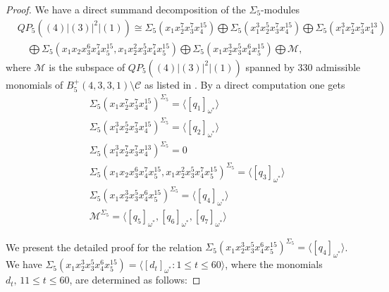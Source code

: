 \documentclass[reqno]{amsart}
\theoremstyle{plain}
\theoremstyle{definition}
\theoremstyle{plain}
\theoremstyle{definition}
\numberwithin{equation}{section}
\begin{document}
\begin{proof} We have a direct summand decomposition of the $\Sigma_5$-modules
\begin{align*}
&QP_5((4)|(3)|^2|(1)) \cong \Sigma_5(x_1x_2^7x_3^7x_4^{15})\bigoplus \Sigma_5(x_1^3x_2^5x_3^7x_4^{15}) \bigoplus \Sigma_5(x_1^3x_2^7x_3^7x_4^{13})\\
&\quad \bigoplus \Sigma_5(x_1x_2x_3^6x_4^7x_5^{15}, x_1x_2^2x_3^5x_4^7x_5^{15}) \bigoplus \Sigma_5(x_1x_2^3x_3^5x_4^6x_5^{15})\bigoplus \mathcal M,
\end{align*}
where $\mathcal M$ is the subspace of $QP_5((4)|(3)|^2|(1))$ spanned by 330 admissible monomials of $B_5^+(4,3,3,1)\setminus \mathcal C$ as listed in \cite[Theorem 3.3.7]{smo}. By a direct computation one gets
\begin{align*}
&\Sigma_5(x_1x_2^7x_3^7x_4^{15})^{\Sigma_5} = \langle[q_1]_{\omega^*}\rangle\\
&\Sigma_5(x_1^3x_2^5x_3^7x_4^{15})^{\Sigma_5} = \langle[q_2]_{\omega^*}\rangle\\
&\Sigma_5(x_1^3x_2^7x_3^7x_4^{13})^{\Sigma_5} = 0\\
&\Sigma_5(x_1x_2x_3^6x_4^7x_5^{15}, x_1x_2^2x_3^5x_4^7x_5^{15})^{\Sigma_5} = \langle[q_3]_{\omega^*}\rangle\\
&\Sigma_5(x_1x_2^3x_3^5x_4^6x_5^{15})^{\Sigma_5} = \langle[q_4]_{\omega^*}\rangle\\
&\mathcal M^{\Sigma_5} = \langle [q_5]_{\omega^*}, [q_6]_{\omega^*}, [q_7]_{\omega^*}\rangle
\end{align*}

\medskip
We present the detailed proof for the relation $\Sigma_5(x_1x_2^3x_3^5x_4^6x_5^{15})^{\Sigma_5} = \langle[q_4]_{\omega^*}\rangle$. We have  $\Sigma_5(x_1x_2^3x_3^5x_4^6x_5^{15}) = \langle [d_t]_{\omega^*}: 1 \leqslant t \leqslant 60\rangle$, where the monomials $d_t,\, 11 \leqslant t \leqslant 60$, are determined as follows:


\end{proof}
\end{document}
